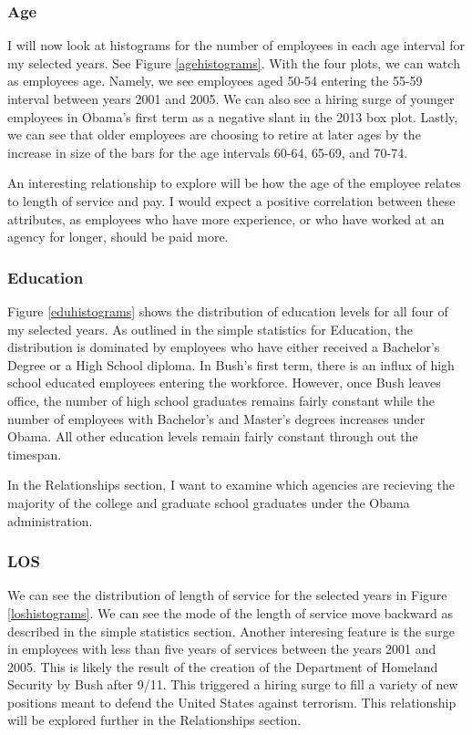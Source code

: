 \documentclass{article}
\begin{document}
        \subsubsection{Age}
        I will now look at histograms for the number of employees in each age interval for my selected years. See Figure \ref{agehistograms}. With the four plots, we can watch as employees age. Namely, we see employees aged 50-54 entering the 55-59 interval between years 2001 and 2005. We can also see a hiring surge of younger employees in Obama's first term as a negative slant in the 2013 box plot. Lastly, we can see that older employees are choosing to retire at later ages by the increase in size of the bars for the age intervals 60-64, 65-69, and 70-74.
        \par
        An interesting relationship to explore will be how the age of the employee relates to length of service and pay. I would expect a positive correlation between these attributes, as employees who have more experience, or who have worked at an agency for longer, should be paid more.

        \subsubsection{Education}
        Figure \ref{eduhistograms} shows the distribution of education levels for all four of my selected years. As outlined in the simple statistics for Education, the distribution is dominated by employees who have either received a Bachelor's Degree or a High School diploma. In Bush's first term, there is an influx of high school educated employees entering the workforce. However, once Bush leaves office, the number of high school graduates remains fairly constant while the number of employees with Bachelor's and Master's degrees increases under Obama. All other education levels remain fairly constant through out the timespan.
        \par
        In the Relationships section, I want to examine which agencies are recieving the majority of the college and graduate school graduates under the Obama administration.

        \subsubsection{LOS}
        We can see the distribution of length of service for the selected years in Figure \ref{loshistograms}. We can see the mode of the length of service move backward as described in the simple statistics section. Another interesing feature is the surge in employees with less than five years of services between the years 2001 and 2005. This is likely the result of the creation of the Department of Homeland Security by Bush after 9/11. This triggered a hiring surge to fill a variety of new positions meant to defend the United States against terrorism. This relationship will be explored further in the Relationships section.
\end{document}
